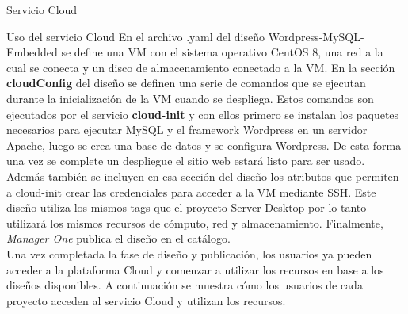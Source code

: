 \begin{subsection}{Servicio Cloud}
\begin{subsubsection}{Uso del servicio Cloud}
        \FloatBarrier
        En el archivo .yaml del diseño Wordpress-MySQL-Embedded se define una VM con el sistema operativo CentOS 8, una red a la cual se conecta y un disco de almacenamiento conectado a la VM. En la sección \textbf{cloudConfig} del diseño se definen una serie de comandos que se ejecutan durante la inicialización de la VM cuando se despliega. Estos comandos son ejecutados por el servicio \textbf{cloud-init} y con ellos primero se instalan los paquetes necesarios para ejecutar MySQL y el framework Wordpress en un servidor Apache, luego se crea una base de datos y se configura Wordpress. De esta forma una vez se complete un despliegue el sitio web estará listo para ser usado. Además también se incluyen en esa sección del diseño los atributos que permiten a cloud-init crear las credenciales para acceder a la VM mediante SSH. Este diseño utiliza los mismos tags que el proyecto Server-Desktop por lo tanto utilizará los mismos recursos de cómputo, red y almacenamiento. Finalmente, \textit{Manager One} publica el diseño en el catálogo.        
        \\
        Una vez completada la fase de diseño y publicación, los usuarios ya pueden acceder a la plataforma Cloud y comenzar a utilizar los recursos en base a los diseños disponibles. A continuación se muestra cómo los usuarios de cada proyecto acceden al servicio Cloud y utilizan los recursos. 

\end{subsubsection}
\end{subsection}
